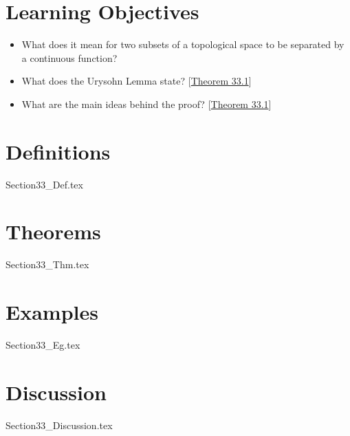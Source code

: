 \section{Learning Objectives}

\begin{itemize}
    \item What does it mean for two subsets of a topological space to be separated 
        by a continuous function?
    \item What does the Urysohn Lemma state?
        [\hyperlink{thm:33.1}{Theorem 33.1}]
    \item What are the main ideas behind the proof?
        [\hyperlink{thm:33.1}{Theorem 33.1}]
\end{itemize}

\section{Definitions}

{Section33_Def.tex}

\section{Theorems}

{Section33_Thm.tex}

\section{Examples}

{Section33_Eg.tex}

\section{Discussion}

{Section33_Discussion.tex}